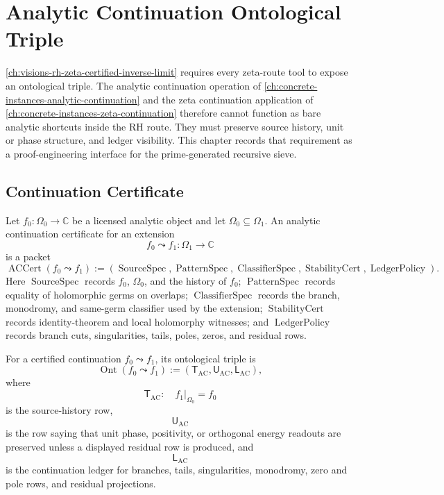 \chapter{Analytic Continuation Ontological Triple}
\label{ch:visions-rh-analytic-continuation-ont-triple}

\autoref{ch:visions-rh-zeta-certified-inverse-limit} requires every
zeta-route tool to expose an ontological triple.  The analytic
continuation operation of
\autoref{ch:concrete-instances-analytic-continuation} and the zeta
continuation application of \autoref{ch:concrete-instances-zeta-continuation}
therefore cannot function as bare analytic shortcuts inside the RH
route.  They must preserve source history, unit or phase structure, and
ledger visibility.  This chapter records that requirement as a
proof-engineering interface for the prime-generated recursive sieve.

\section{Continuation Certificate}
\label{sec:rh-analytic-continuation-ont-triple-certificate}

\begin{definition}
\label{def:rh-analytic-continuation-certificate}
Let $f_0:\Omega_0\to\mathbb C$ be a licensed analytic object and let
$\Omega_0\subseteq\Omega_1$.  An analytic continuation certificate for
an extension
$$
f_0\leadsto f_1:\Omega_1\to\mathbb C
$$
is a packet
$$
\operatorname{ACCert}(f_0\leadsto f_1)
:=
(\operatorname{SourceSpec},
\operatorname{PatternSpec},
\operatorname{ClassifierSpec},
\operatorname{StabilityCert},
\operatorname{LedgerPolicy}).
$$
Here $\operatorname{SourceSpec}$ records $f_0$, $\Omega_0$, and the
history of $f_0$; $\operatorname{PatternSpec}$ records equality of
holomorphic germs on overlaps; $\operatorname{ClassifierSpec}$ records
the branch, monodromy, and same-germ classifier used by the extension;
$\operatorname{StabilityCert}$ records identity-theorem and local
holomorphy witnesses; and $\operatorname{LedgerPolicy}$ records branch
cuts, singularities, tails, poles, zeros, and residual rows.
\end{definition}

\begin{definition}
\label{def:rh-continuation-ontological-triple}
For a certified continuation $f_0\leadsto f_1$, its ontological triple
is
$$
\operatorname{Ont}(f_0\leadsto f_1)
:=
(\mathsf T_{\mathrm{AC}},\mathsf U_{\mathrm{AC}},\mathsf L_{\mathrm{AC}}),
$$
where
$$
\mathsf T_{\mathrm{AC}}:
\quad
f_1|_{\Omega_0}=f_0
$$
is the source-history row,
$$
\mathsf U_{\mathrm{AC}}
$$
is the row saying that unit phase, positivity, or orthogonal energy
readouts are preserved unless a displayed residual row is produced, and
$$
\mathsf L_{\mathrm{AC}}
$$
is the continuation ledger for branches, tails, singularities,
monodromy, zero and pole rows, and residual projections.
\end{definition}


